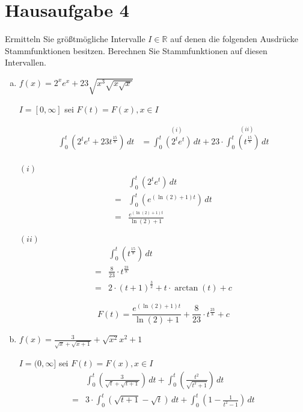 \documentclass{article}
\begin{document}
\section*{Hausaufgabe 4}

Ermitteln Sie größtmögliche Intervalle $I \in \mathbb{R}$ auf denen
die folgenden Ausdrücke Stammfunktionen besitzen.
Berechnen Sie Stammfunktionen auf diesen Intervallen.

\begin{enumerate}[a)]
\item $f(x) = 2^xe^x + 23 \sqrt{x^3\sqrt{x\sqrt{x}}}$

  $I = [0, \infty]$ sei $F(t) = F(x), x \in I$

  \begin{align*}
    \int_0^t \left( 2^te^t + 23 t^{\frac{15}{8}} \right)\,dt &=
    \overset{(i)}{\int_0^t \left( 2^te^t \right) \,dt} + 23 \cdot \overset{(ii)}{\int_0^t \left(t^{\frac{15}{8}} \right) \,dt} \\
  \end{align*}
  \begin{minipage}[t]{.45\textwidth}
    \textbf{$(i)$}
    \begin{align*}
      &\int_0^t \left( 2^te^t \right) \,dt \\
      = & \int_0^t \left( e^{(\ln(2) + 1)t} \right) \,dt \\
      = & \frac{e^{(\ln(2) + 1)t}}{\ln(2) + 1}
    \end{align*}
  \end{minipage}
  \hfill
  \begin{minipage}[t]{.45\textwidth}
    \textbf{$(ii)$}
    \begin{align*}
      &\int_0^t \left( t^{\frac{15}{8}} \right) \,dt \\
      = & \frac{8}{23} \cdot t^{\frac{23}{8}} \\
      = & 2 \cdot (t + 1)^{\frac{3}{2}} + t \cdot \arctan (t) + c
    \end{align*}
  \end{minipage}
  \[
    F(t) = \frac{e^{(\ln(2) + 1)t}}{\ln(2) + 1} + \frac{8}{23} \cdot t^{\frac{23}{8}} + c
  \]

\item $f(x) = \frac{3}{\sqrt{x} + \sqrt{x + 1}} + \sqrt{x^2}{x^2 + 1}$

  $I = (0, \infty]$ sei $F(t) = F(x), x \in I$
  \begin{align*}
    &\int_0^t \left( \frac{3}{\sqrt{t} + \sqrt{t + 1}} \right)\,dt + \int_0^t \left( \frac{t^2}{\sqrt{t^2 + 1}} \right)\,dt \\
    = &3 \cdot \int_0^t \left( \sqrt{t + 1} - \sqrt{t} \right)\,dt + \int_0^t \left( 1 - \frac{1}{t^2 - 1} \right)\,dt
  \end{align*}


\end{enumerate}
\end{document}
